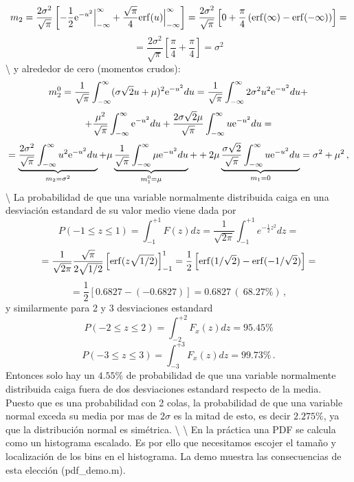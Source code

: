 \documentclass[
]{agujournal2019}
\begin{document}
\[m_2=\frac{2\sigma^2}{\sqrt{\pi}}\left[ -\frac{1}{2}{\rm e}^{-u^2}
      \Big|^{\infty}_{-\infty} +\frac{\sqrt{\pi}}{4} {\rm erf}(u)\Big|^{\infty}_{-\infty}\right]=
  \frac{2\sigma^2}{\sqrt{\pi}}\left[0 + \frac{\pi}{4}\left({\rm erf}(\infty) - {\rm erf}(-\infty) \right)
  \right]=\]
\[=\frac{2\sigma^2}{\sqrt{\pi}}\left[ \frac{\pi}{4}+\frac{\pi}{4}\right]=\sigma^2\]
\textbackslash{} y alrededor de cero (momentos crudos):
\[m^0_2=\frac{1}{\sqrt{\pi}}\int^{\infty}_{-\infty}(\sigma \sqrt{2} u + \mu)^2{\rm e}^{-u^2}du=
   \frac{1}{\sqrt{\pi}}\int^{\infty}_{-\infty}2\sigma^2 u^2{\rm e}^{-u^2}du +\]
\[
   +\frac{\mu^2}{\sqrt{\pi}}\int^{\infty}_{-\infty}{\rm e}^{-u^2}du
   +\frac{2\sigma\sqrt{2}\mu}{\sqrt{\pi}}\int^{\infty}_{-\infty}u{\rm e}^{-u^2}du=\]
\[
   =\underbrace{\frac{2\sigma^2}{\sqrt{\pi}}\int^{\infty}_{-\infty}u^2{\rm e}^{-u^2}du}_{m_2=\sigma^2}
   +\mu \underbrace{\frac{1}{\sqrt{\pi}}\int^{\infty}_{-\infty}\mu{\rm e}^{-u^2}du}_{m_1^0=\mu}+
   +2\mu \underbrace{\frac{\sigma\sqrt{2}}{\sqrt{\pi}}\int^{\infty}_{-\infty}u{\rm e}^{-u^2}du}_{m_1=0}=
   \sigma^2+\mu^2\,,\] \textbackslash{} La probabilidad de que una
variable normalmente distribuida caiga en una desviación estandard de su
valor medio viene dada por
\[P(-1\le z \le 1)=\int^{+1}_{-1} F(z) dz=\frac{1}{\sqrt{2\pi}}\int^{+1}_{-1}e^{-\frac{1}{2}z^2}dz=\]
\[=\frac{1}{\sqrt{2\pi}}\frac{\sqrt{\pi}}{2\sqrt{1/2}}\left[{\rm erf}({z\sqrt{1/2}})\right]^1_{-1}=
   \frac{1}{2}\left[{\rm erf}({1/\sqrt{2}})-{\rm erf}({-1/\sqrt{2}}) \right]=\]
\[=\frac{1}{2}\left[0.6827-(-0.6827)\right]=0.6827\,(~68.27\%)\,,\] y
similarmente para 2 y 3 desviaciones estandard
\[P(-2\le z \le 2)=\int^{+2}_{-2} F_x(z) dz=95.45\%\]
\[P(-3\le z \le 3)=\int^{+3}_{-3} F_x(z) dz=99.73\%\,.\] Entonces solo
hay un \(4.55\%\) de probabilidad de que una variable normalmente
distribuida caiga fuera de dos desviaciones estandard respecto de la
media. Puesto que es una probabilidad con 2 colas, la probabilidad de
que una variable normal exceda su media por mas de \(2\sigma\) es la
mitad de esto, es decir \(2.275\%\), ya que la distribución normal es
simétrica. \textbackslash{} \textbackslash{} En la práctica una PDF se
calcula como un histograma escalado. Es por ello que necesitamos escojer
el tamaño y localización de los bins en el histograma. La demo muestra
las consecuencias de esta elección (pdf\_demo.m).

\begin{center}
\end{center}
\end{document}
